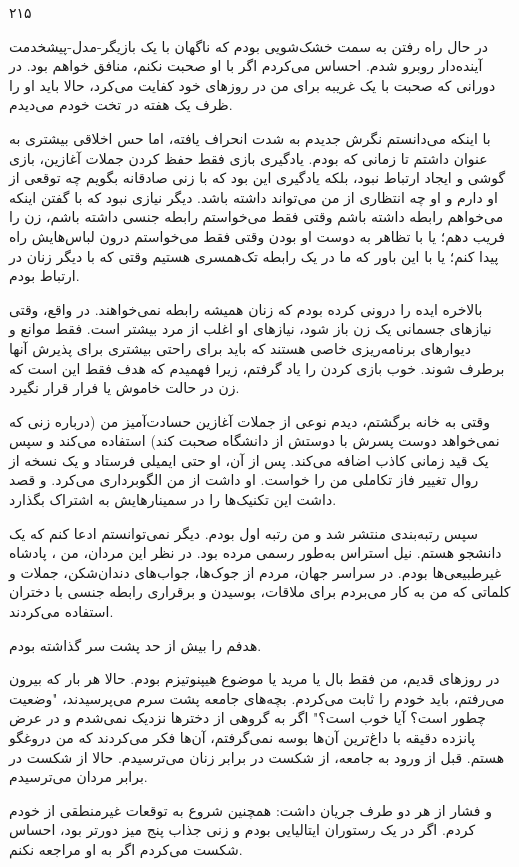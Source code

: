 ۲۱۵

در حال راه رفتن به سمت خشک‌شویی بودم که ناگهان با یک بازیگر-مدل-پیشخدمت آینده‌دار روبرو شدم. احساس می‌کردم اگر با او صحبت نکنم، منافق خواهم بود. در دورانی که صحبت با یک غریبه برای من در روزهای  خود کفایت می‌کرد، حالا باید او را ظرف یک هفته در تخت خودم می‌دیدم.

با اینکه می‌دانستم نگرش جدیدم به شدت انحراف یافته، اما حس اخلاقی بیشتری به عنوان  داشتم تا زمانی که  بودم. یادگیری بازی فقط حفظ کردن جملات آغازین، بازی گوشی و ایجاد ارتباط نبود، بلکه یادگیری این بود که با زنی صادقانه بگویم چه توقعی از او دارم و او چه انتظاری از من می‌تواند داشته باشد. دیگر نیازی نبود که با گفتن اینکه می‌خواهم رابطه داشته باشم وقتی فقط می‌خواستم رابطه جنسی داشته باشم، زن را فریب دهم؛ یا با تظاهر به دوست او بودن وقتی فقط می‌خواستم درون لباس‌هایش راه پیدا کنم؛ یا با این باور که ما در یک رابطه تک‌همسری هستیم وقتی که با دیگر زنان در ارتباط بودم.

بالاخره ایده را درونی کرده بودم که زنان همیشه رابطه نمی‌خواهند. در واقع، وقتی نیازهای جسمانی یک زن باز شود، نیازهای او اغلب از مرد بیشتر است. فقط موانع و دیوارهای برنامه‌ریزی خاصی هستند که باید برای راحتی بیشتری برای پذیرش آنها برطرف شوند. خوب بازی کردن را یاد گرفتم، زیرا فهمیدم که هدف  فقط این است که زن در حالت خاموش یا فرار قرار نگیرد.

وقتی به خانه برگشتم، دیدم  نوعی از جملات آغازین حسادت‌آمیز من (درباره زنی که نمی‌خواهد دوست پسرش با دوستش از دانشگاه صحبت کند) استفاده می‌کند و سپس یک قید زمانی کاذب اضافه می‌کند. پس از آن، او حتی ایمیلی فرستاد و یک نسخه از روال تغییر فاز تکاملی من را خواست. او داشت از من الگوبرداری می‌کرد. و قصد داشت این تکنیک‌ها را در سمینارهایش به اشتراک بگذارد.

سپس رتبه‌بندی  منتشر شد و من رتبه اول بودم. دیگر نمی‌توانستم ادعا کنم که یک دانشجو هستم. نیل استراس به‌طور رسمی مرده بود. در نظر این مردان، من ، پادشاه غیرطبیعی‌ها بودم. در سراسر جهان، مردم از جوک‌ها، جواب‌های دندان‌شکن، جملات و کلماتی که من به کار می‌بردم برای ملاقات، بوسیدن و برقراری رابطه جنسی با دختران استفاده می‌کردند.

هدفم را بیش از حد پشت سر گذاشته بودم.

در روزهای قدیم، من فقط بال  یا مرید  یا موضوع هیپنوتیزم  بودم. حالا هر بار که بیرون می‌رفتم، باید خودم را ثابت می‌کردم. بچه‌های جامعه پشت سرم می‌پرسیدند، "وضعیت  چطور است؟ آیا خوب است؟" اگر به گروهی از دخترها نزدیک نمی‌شدم و در عرض پانزده دقیقه با داغ‌ترین آن‌ها بوسه نمی‌گرفتم، آن‌ها فکر می‌کردند که من دروغگو هستم. قبل از ورود به جامعه، از شکست در برابر زنان می‌ترسیدم. حالا از شکست در برابر مردان می‌ترسیدم.

و فشار از هر دو طرف جریان داشت: همچنین شروع به توقعات غیرمنطقی از خودم کردم. اگر در یک رستوران ایتالیایی بودم و زنی جذاب پنج میز دورتر بود، احساس شکست می‌کردم اگر به او مراجعه نکنم.